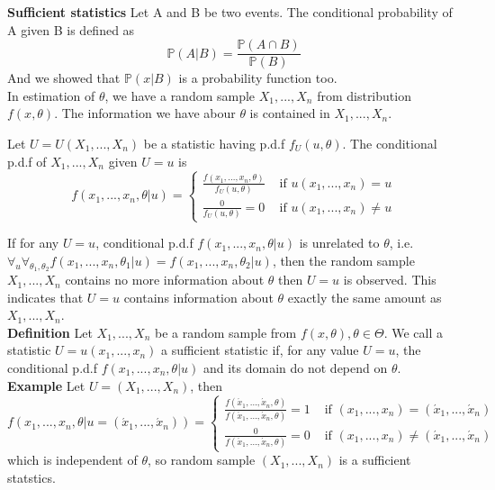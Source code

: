 \documentclass[a4paper,12pt]{article}
\begin{document}
\textbf{Sufficient statistics}
Let A and B be two events. The conditional probability of A given B is defined as
$$\mathbb{P}(A|B) = \frac{\mathbb{P}(A\cap B)}{\mathbb{P}(B)}$$
And we showed that $\mathbb{P}(x|B)$ is a probability function too.\\

In estimation of $\theta$, we have a random sample $X_1, ..., X_n$ from distribution $f(x, \theta)$. The information we have abour $\theta$ is contained in $X_1, ..., X_n$.

Let $U = U(X_1, ..., X_n)$ be a statistic having p.d.f $f_U(u, \theta)$. The conditional p.d.f of $X_1, ..., X_n$ given $U=u$ is
$$f( x_1, ..., x_n, \theta | u ) = 
\begin{cases}
\frac{f(x_1, ..., x_n, \theta)}{f_U(u, \theta)} & \text{ if } u(x_1, ..., x_n) = u \\
\frac{0}{f_U(u, \theta)} = 0 & \text{ if } u(x_1, ..., x_n) \neq u
\end{cases}$$

If for any $U = u$, conditional p.d.f $f(x_1, ..., x_n, \theta | u)$ is unrelated to $\theta$, i.e. $\forall_u\forall_{\theta_1, \theta_2} f(x_1, ..., x_n, \theta_1 | u) = f(x_1, ..., x_n, \theta_2 | u)$, then the random sample $X_1, ..., X_n$ contains no more information about $\theta$ then $U=u$ is observed. This indicates that $U=u$ contains information about $\theta$ exactly the same amount as $X_1, ..., X_n$.\\

\textbf{Definition} Let $X_1, ..., X_n$ be a random sample from $f(x, \theta), \theta\in\Theta$. We call a statistic $U=u(x_1, ..., x_n)$ a sufficient statistic if, for any value $U=u$, the conditional p.d.f $f(x_1, ..., x_n, \theta | u)$ and its domain do not depend on $\theta$.\\

\textbf{Example} Let $U = (X_1, ..., X_n)$, then
$$f(x_1, ..., x_n, \theta | u = (\acute{x}_1, ..., \acute{x}_n)) = 
\begin{cases}
\frac{f(\acute{x}_1, ..., \acute{x}_n, \theta)}{f(\acute{x}_1, ..., \acute{x}_n, \theta)} = 1 & \text{ if } (x_1, ..., x_n) = (\acute{x}_1, ..., \acute{x}_n) \\
\frac{0}{f(\acute{x}_1, ..., \acute{x}_n, \theta)} = 0 & \text{ if } (x_1, ..., x_n) \neq (\acute{x}_1, ..., \acute{x}_n)
\end{cases}
$$
which is independent of $\theta$, so random sample $(X_1, ..., X_n)$ is a sufficient statstics.\\
\end{document}
